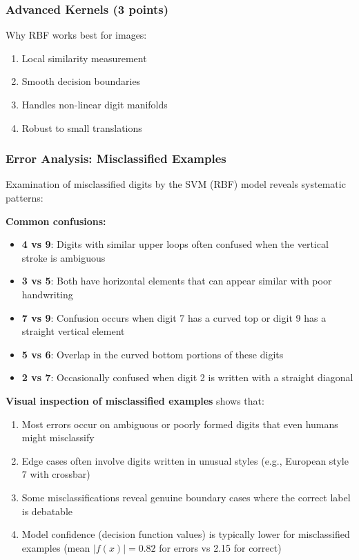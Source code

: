 \documentclass[12pt,a4paper]{article}
\theoremstyle{definition}
\begin{document}
\subsubsection{Advanced Kernels (3 points)}

Why RBF works best for images:
\begin{enumerate}
\item Local similarity measurement
\item Smooth decision boundaries
\item Handles non-linear digit manifolds
\item Robust to small translations
\end{enumerate}

\subsubsection{Error Analysis: Misclassified Examples}

Examination of misclassified digits by the SVM (RBF) model reveals systematic patterns:

\textbf{Common confusions:}
\begin{itemize}
\item \textbf{4 vs 9}: Digits with similar upper loops often confused when the vertical stroke is ambiguous
\item \textbf{3 vs 5}: Both have horizontal elements that can appear similar with poor handwriting
\item \textbf{7 vs 9}: Confusion occurs when digit 7 has a curved top or digit 9 has a straight vertical element
\item \textbf{5 vs 6}: Overlap in the curved bottom portions of these digits
\item \textbf{2 vs 7}: Occasionally confused when digit 2 is written with a straight diagonal
\end{itemize}

\textbf{Visual inspection of misclassified examples} shows that:
\begin{enumerate}
\item Most errors occur on ambiguous or poorly formed digits that even humans might misclassify
\item Edge cases often involve digits written in unusual styles (e.g., European style 7 with crossbar)
\item Some misclassifications reveal genuine boundary cases where the correct label is debatable
\item Model confidence (decision function values) is typically lower for misclassified examples (mean $|f(x)| = 0.82$ for errors vs 2.15 for correct)
\end{enumerate}
\end{document}
